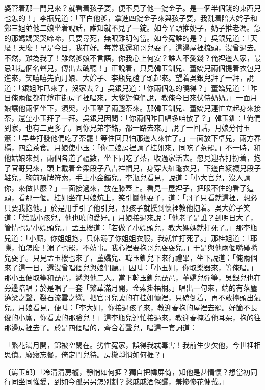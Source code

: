 \begin{showcontents}{}
婆管着那一門兒來？就看着孩子耍，便不見了他一錠金子。是一個半個錢的東西兒也怎的！」李瓶兒道：「平白他爹，拿進四錠金子來與孩子耍，我亂着陪大妗子和鄭三姐並他二娘坐着說話，誰知就不見了一錠。如今丫頭推奶子，奶子推老馮。急的那媽媽哭哭啼啼，只要尋死，無眼難明勾當。如今寃誰的是？」吳銀兒道：「天麼！天麼！早是今日，我在好。每常我還和哥兒耍子，這邊屋裡梳頭，沒曾過去。不然，難為我了！雖然爹娘不言語，你我心上何安？誰人不愛錢？俺裡邊人家，最忌叫這個名聲兒，傳出去醜聽！」正說着，只見韓玉釧兒、董嬌兒兩個提着衣包兒進來，笑嘻嘻先向月娘、大妗子、李瓶兒磕了頭起來。望着吳銀兒拜了一拜，說道：「銀姐昨已來了，沒家去？」吳銀兒道：「你兩個怎的曉得？」董嬌兒道：「昨日俺兩個都在燈巿街房子裡唱來，大爹對俺們說，教俺今日來伏侍奶奶。」一面月娘讓他兩個坐下，須臾，小玉拏了兩盞茶來。那韓玉釧兒、董嬌兒連忙立起身來接茶，還望小玉拜了一拜。吳銀兒因問：「你兩個昨日唱多咱散了？」韓玉釧：「俺們到家，也有二更多了。同你兄弟李銘，都一路去來。」說了一回話，月娘分付玉簫：「早些打發他們吃了茶罷！等住回只怕那邊人來忙了。」一面放下卓兒，兩方春槅，四盒茶食。月娘使小玉：「你二娘房裡請了桂姐來，同吃了茶罷。」不一時，和他姑娘來到，兩個各道了禮數，坐下同吃了茶，收過家活去。忽見迎春打扮着，抱了官哥兒來，頭上戴着金梁段子八吉祥帽兒，身穿大紅氅衣兒，下邊白綾襪兒段子鞋兒，胸前項牌符索，手上小金鐲兒。李瓶兒看見，說道：「小大官兒，沒人請你，來做甚麼？」一面接過來，放在膝蓋上。看見一屋裡子，把眼不住的看了這頭，看那一個。桂姐坐在月娘炕上，笑引鬬他耍子，道：「哥子只看就這裡，想必只要我抱他。」於是用手引了他引兒，那孩子就撲到懷裡教他抱着。吳大妗子笑道：「恁點小孩兒，他也曉的愛好。」月娘接過來說：「他老子是誰？到明日大了，管情也是小嫖頭兒。」孟玉樓道：「若做了小嫖頭兒，教大媽媽就打死了。」那李瓶兒道：「小廝，你姐姐抱，只休溺了你姐姐衣服，我就忙打死了。」那桂姐道：「耶嚛，怕怎麼！溺了也罷，不妨事。我心裡要抱哥兒耍耍兒。」于是與他兩個嘴碰嘴兒耍子。只見孟玉樓也來了，董嬌兒、韓玉釧兒下來行禮畢，坐下說道：「俺兩個來了這一日，還沒曾唱個兒與娘們聽。」因叫：「小玉姐，你取樂器來，等俺唱。」那小玉便取箏和琵琶，遞與他二人。當下韓玉釧兒琵琶，董嬌兒彈箏，吳銀兒也在旁邊陪唱；於是唱了一套「繁華滿月開，金索掛梧桐。」唱出一句來，端的有落塵遶梁之聲，裂石流雲之響。把官哥兒諕的在桂姐懷裡，只磕倒着，再不敢擡頭出氣兒。月娘看見，便叫：「李大姐，你接過孩子來，教迎春抱的屋裡去罷。好箇不長俊的小廝，你看諕的那臉兒！」這李瓶兒連忙接過來，教迎春掩着他耳朵，抱的往那邊房裡去了。於是四個唱的，齊合着聲兒，唱這一套詞道：

「繁花滿月開，錦被空閑在。劣性寃家，誤得我忒毒害！我前生少欠他，今世裡相思債。廢寢忘餐，倚定門兒待。房櫳靜悄如何捱？」

〔罵玉郎〕「冷清清房櫳，靜悄如何捱？獨自把幃屏倚，知他是甚情懷？想當初同行同坐同懽愛，到如今孤另另怎別劃？愁戚戚酒倦釃，羞慘慘花慵戴。」


\end{showcontents}
